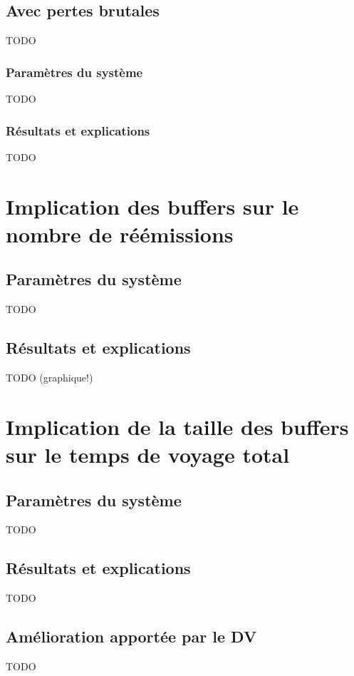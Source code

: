 \documentclass[a4paper,11pt]{article}
\begin{document}
\subsection{Avec pertes brutales}
TODO
\subsubsection{Paramètres du système}
TODO
\subsubsection{Résultats et explications}
TODO



\section{Implication des buffers sur le nombre de réémissions}
\subsection{Paramètres du système}
TODO

\subsection{Résultats et explications}
TODO (graphique!)






\section{Implication de la taille des buffers sur le temps de voyage total}
\subsection{Paramètres du système}
TODO

\subsection{Résultats et explications}
TODO







\subsection{Amélioration apportée par le DV}
TODO







\clearpage


\appendix
\end{document}
